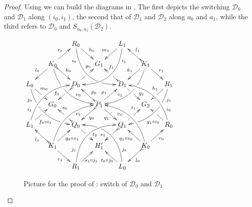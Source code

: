 \documentclass[a4paper,UKenglish,cleveref,pdftex,thm-restate,numberwithinsect,anonymous]{lipics}
\newcommand{\dder}[1]{\mathscr{#1}}
\begin{document}
\begin{proof}   
	Using  we can build the diagrams in .  The first depicts the  switching $\dder{D}_0$ and $\dder{D}_1$ along  $(i_0, i_1)$, the second that of $\dder{D}_1$ and $\dder{D}_2$ along $a_0$ and $a_1$, while the third refers to $\dder{D}_0$ and
	$S_{a_0,a_1}(\dder{D}_2)$.
	
	\begin{figure}[h]
		\centering
	$\xymatrix@C=15pt@R=15pt{&&R_0 \ar@/_.8cm/[ddrr]_(.2){i_0}|(.7)\hole
		\ar[dr]^{h_0}&& L_1\ar@/^.8cm/[ddll]^(.2){i_1}
		\ar[dl]_{m_1}\\&K_0\ar@{>->}[dr]^{k_0}\ar[dl]_{l_0}
		\ar@/_.6cm/[ddrr]|(.36)\hole^(.65){v_0}\ar[ur]^{r_0}&& G_1 &&
		K_1
		\ar@/^.6cm/[ddll]|(.36)\hole_(.65){v_1}\ar[dl]_{k_1}\ar@{>->}[lu]_{l_1}
		\ar[dr]^{r_1}\\L_0
		\ar@/_.6cm/[ddrr]_(.2){j_0}|(.31)\hole|(.81)\hole
		\ar[dr]^(.4){m_0}|(.61)\hole && D_0
		\ar@{>->}[dl]|(.4)\hole_(.65){f_0}\ar[ur]|(.5)\hole^(.7){g_0}&&D_1
		\ar[dr]|(.4)\hole^(.65){g_1}
		\ar@{>->}[ul]|(.5)\hole_(.65){f_1}&&R_1\ar@/^.6cm/[ddll]^(.2){j_1}|(.31)\hole|(.81)\hole\ar[dl]_(.4){h_1}|(.6)\hole\\&G_0
		&&P_1\ar[dr]_{q_1}
		\ar@{>->}[dl]^{q_0}\ar[ur]^(.4){p_1}\ar@{>->}[ul]_(.4){p_0}&&G_2\\L_1
		\ar@/^.6cm/[uurr]^(.2){i_1} \ar[ur]_(.35){f_0\circ
			i_1}|(.61)\hole&&Q_0
		\ar@{>->}[ul]|(.4)\hole_(.65){s_0}\ar[dr]|(.5)\hole^(.65){t_0}
		&&Q_1\ar[ur]|(.4)\hole^(.65){t_1} \ar@{>->}[dl]|(.5)\hole_(.65){s_1}
		&& R_0 \ar[ul]^(.35){g_1\circ
			i_0}|(.61)\hole\ar@/_.6cm/[uull]_(.2){i_0}\\&K_1
		\ar[ur]_{q_0\circ v_1} \ar[dr]_{r_1}
		\ar@{>->}[ul]^{l_1}\ar@/^.6cm/[uurr]_(.65){v_1}&&H'_1&& K_0
		\ar[ur]_{r_0} \ar[ul]^{q_1\circ v_0} \ar@{>->}[dl]^{l_0}
		\ar@/_.6cm/[uull]^(.65){v_0}\\&& R_1
		\ar[ur]_{\hspace{-6pt}s_1\circ
			j_1}\ar@/^.8cm/[uurr]^(.2){j_1}&& L_0 \ar[ul]^{t_0\circ
			j_0\hspace{-6pt}} \ar@/_.8cm/[uull]_(.2){j_0} |(.69)\hole
	}	$
		\caption{Picture for the proof of : switch of $\dder{D}_0$ and $\dder{D}_1$}
		\label{fi:first}
	\end{figure}
	

\end{proof}
\end{document}
